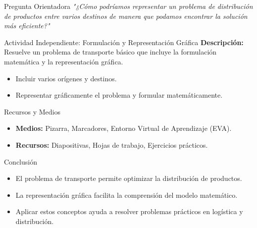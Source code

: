 \documentclass{beamer}
\begin{document}
\begin{frame}{Pregunta Orientadora}
    \textit{"¿Cómo podríamos representar un problema de distribución de productos entre varios destinos de manera que podamos encontrar la solución más eficiente?"}
\end{frame}

\begin{frame}{Actividad Independiente: Formulación y Representación Gráfica}
    \textbf{Descripción:} Resuelve un problema de transporte básico que incluye la formulación matemática y la representación gráfica.
    \begin{itemize}
        \item Incluir varios orígenes y destinos.
        \item Representar gráficamente el problema y formular matemáticamente.
    \end{itemize}
\end{frame}

\begin{frame}{Recursos y Medios}
    \begin{itemize}
        \item \textbf{Medios:} Pizarra, Marcadores, Entorno Virtual de Aprendizaje (EVA).
        \item \textbf{Recursos:} Diapositivas, Hojas de trabajo, Ejercicios prácticos.
    \end{itemize}
\end{frame}

\begin{frame}{Conclusión}
    \begin{itemize}
        \item El problema de transporte permite optimizar la distribución de productos.
        \item La representación gráfica facilita la comprensión del modelo matemático.
        \item Aplicar estos conceptos ayuda a resolver problemas prácticos en logística y distribución.
    \end{itemize}
\end{frame}
\end{document}
